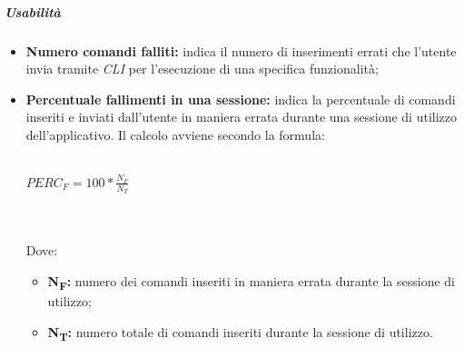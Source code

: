 \subparagraph*{Usabilità}
\begin{itemize}
	\item \textbf{Numero comandi falliti:} indica il numero di inserimenti errati che l'utente invia tramite \textit{CLI\glos} per l'esecuzione di una specifica funzionalità;
	\item \textbf{Percentuale fallimenti in una sessione:} indica la percentuale di comandi inseriti e inviati dall'utente in maniera errata durante una sessione di utilizzo dell'applicativo. Il calcolo avviene secondo la formula:\\\\
	\centerline{
		\begin{math}
		PERC_{F}=100*\frac{N_{F}}{N_T}
		\end{math}
	}
	\\\\Dove:
	\begin{itemize}
		\item \textbf{N\textsubscript{F}:} numero dei comandi inseriti in maniera errata durante la sessione di utilizzo;
		\item \textbf{N\textsubscript{T}:} numero totale di comandi inseriti durante la sessione di utilizzo.
	\end{itemize}
\end{itemize}

